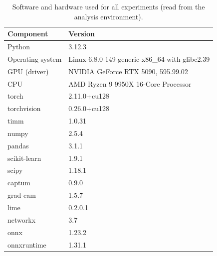 \begin{table}[!htb]
\centering
\caption{Software and hardware used for all experiments (read from the analysis environment).}
\label{tab:software}
\footnotesize
\begin{tabular}{ll}
\hline
Component & Version \\
\hline
Python & 3.12.3 \\
Operating system & Linux-6.8.0-149-generic-x86\_64-with-glibc2.39 \\
GPU (driver) & NVIDIA GeForce RTX 5090, 595.99.02 \\
CPU & AMD Ryzen 9 9950X 16-Core Processor \\
torch & 2.11.0+cu128 \\
torchvision & 0.26.0+cu128 \\
timm & 1.0.31 \\
numpy & 2.5.4 \\
pandas & 3.1.1 \\
scikit-learn & 1.9.1 \\
scipy & 1.18.1 \\
captum & 0.9.0 \\
grad-cam & 1.5.7 \\
lime & 0.2.0.1 \\
networkx & 3.7 \\
onnx & 1.23.2 \\
onnxruntime & 1.31.1 \\
\hline
\end{tabular}
\end{table}